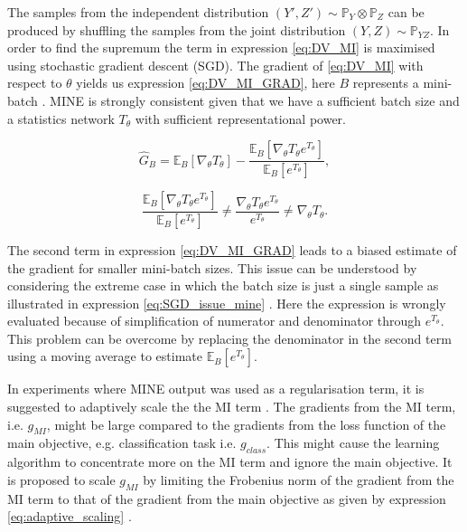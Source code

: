 \documentclass[12pt,DIV14,BCOR12mm,a4paper,footinclude=false,headinclude,parskip=half-,twoside,openright,cleardoublepage=empty,toc=index,bibliography=totoc,listof=totoc]{scrreprt}
\numberwithin{equation}{chapter}
\begin{document}
The samples from the independent distribution $(Y',Z') \sim \mathbb{P}_Y \otimes
 \mathbb{P}_Z$ can be produced by shuffling the samples from the joint distribution $(Y, Z) \sim \mathbb{P}_{YZ}$. In order to find the supremum the term in expression \ref{eq:DV_MI} is maximised using stochastic gradient descent (SGD). The gradient of \ref{eq:DV_MI} with respect to $\theta$ yields us expression \ref{eq:DV_MI_GRAD}, here $B$ represents a mini-batch \cite{DBLP:journals/corr/abs-1801-04062}. MINE is strongly consistent given that we have a sufficient batch size and a statistics network $T_{\theta}$ with sufficient representational power.

 \begin{equation}\label{eq:DV_MI_GRAD}
\widehat{G}_{B}=\mathbb{E}_{B}\left[\nabla_{\theta} T_{\theta}\right]-\frac{\mathbb{E}_{B}\left[\nabla_{\theta} T_{\theta} e^{T_{\theta}}\right]}{\mathbb{E}_{B}\left[e^{T_{\theta}}\right]},
\end{equation}

 \begin{equation}\label{eq:SGD_issue_mine}
\frac{\mathbb{E}_{B}\left[\nabla_{\theta} T_{\theta} e^{T_{\theta}}\right]}{\mathbb{E}_{B}\left[e^{T_{\theta}}\right]}\neq \frac{\nabla_{\theta} T_{\theta} e^{T_{\theta}}}{e^{T_{\theta}}}\neq \nabla_{\theta} T_{\theta}.
\end{equation}

 The second term in expression \ref{eq:DV_MI_GRAD} leads to a biased estimate of the gradient for smaller mini-batch sizes. This issue can be understood by considering the extreme case in which the batch size is just a single sample as illustrated in expression \ref{eq:SGD_issue_mine} \cite{ruihongqiuExplanationMutual}. Here the expression is wrongly evaluated because of simplification of numerator and denominator through $e^{T_{\theta}}$. This problem can be overcome by replacing the denominator in the second term using a moving average to estimate $\mathbb{E}_{B}\left[e^{T_{\theta}}\right]$. 

In experiments where MINE output was used as a regularisation term, it is suggested to adaptively scale the the MI term \cite{DBLP:journals/corr/abs-1801-04062}. The gradients from the MI term, i.e. $g_{MI}$, might be large compared to the gradients from the loss function of the main objective, e.g. classification task i.e. $g_{class}$. This might cause the learning algorithm to concentrate more on the MI term and ignore the main objective. It is proposed to scale $g_{MI}$ by limiting the Frobenius norm of the gradient from the MI term to that of the gradient from the main objective as given by expression \ref{eq:adaptive_scaling} \cite{DBLP:journals/corr/abs-1801-04062}.
\end{document}
